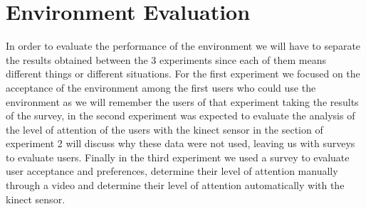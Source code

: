 \chapter{Environment Evaluation} \label{enveva} 
In order to evaluate the performance of the environment we will have to separate the results obtained between the 3 experiments since each of them means different things or different situations. For the first experiment we focused on the acceptance of the environment among the first users who could use the environment as we will remember the users of that experiment taking the results of the survey, in the second experiment was expected to evaluate the analysis of the level of attention of the users with the kinect sensor in the section of experiment 2 will discuss why these data were not used, leaving us with surveys to evaluate users. Finally in the third experiment we used a survey to evaluate user acceptance and preferences, determine their level of attention manually through a video and determine their level of attention automatically with the kinect sensor.

